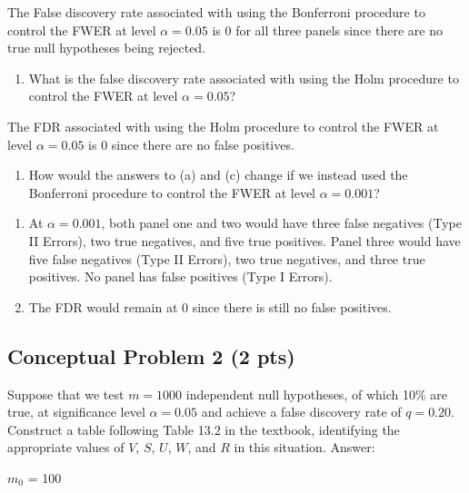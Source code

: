 \documentclass[
]{article}
\providecommand{\tightlist}{%
  \setlength{\itemsep}{0pt}\setlength{\parskip}{0pt}}
\begin{document}
The False discovery rate associated with using the Bonferroni procedure
to control the FWER at level \(\alpha = 0.05\) is 0 for all three panels
since there are no true null hypotheses being rejected.

\begin{enumerate}
\def\labelenumi{(\alph{enumi})}
\setcounter{enumi}{3}
\tightlist
\item
  What is the false discovery rate associated with using the Holm
  procedure to control the FWER at level \(\alpha = 0.05\)?
\end{enumerate}

The FDR associated with using the Holm procedure to control the FWER at
level \(\alpha = 0.05\) is 0 since there are no false positives.

\begin{enumerate}
\def\labelenumi{(\alph{enumi})}
\setcounter{enumi}{4}
\tightlist
\item
  How would the answers to (a) and (c) change if we instead used the
  Bonferroni procedure to control the FWER at level \(\alpha = 0.001\)?
\end{enumerate}

\begin{enumerate}
\def\labelenumi{\alph{enumi})}
\item
  At \(\alpha = 0.001\), both panel one and two would have three false
  negatives (Type II Errors), two true negatives, and five true
  positives. Panel three would have five false negatives (Type II
  Errors), two true negatives, and three true positives. No panel has
  false positives (Type I Errors).
\item
  The FDR would remain at 0 since there is still no false positives.
\end{enumerate}

\hypertarget{conceptual-problem-2-2-pts}{%
\subsection{Conceptual Problem 2 (2
pts)}\label{conceptual-problem-2-2-pts}}

Suppose that we test \(m = 1000\) independent null hypotheses, of which
10\% are true, at significance level \(\alpha = 0.05\) and achieve a
false discovery rate of \(q = 0.20\). Construct a table following Table
13.2 in the textbook, identifying the appropriate values of \(V\),
\(S\), \(U\), \(W\), and \(R\) in this situation. Answer:

\(m_0\) = 100
\end{document}
